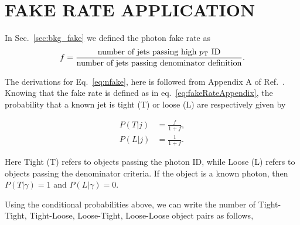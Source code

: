 \chapter{FAKE RATE APPLICATION}
\RaggedRight \parindent=25pt
\label{ch:appendix_fake_rate_app}
In Sec.~\ref{sec:bkg_fake} we defined the photon fake rate as 
\begin{equation} \label{eq:fakeRateAppendix}
f=\frac{\mbox{number of jets passing high \pt ID}}{\mbox{number of jets passing denominator definition}}.
\end{equation}





 
The derivations for Eq.~\ref{eq:nfake}, here is followed from Appendix A of Ref.~\cite{Kaplan:2017}. Knowing that the fake rate is defined as in  eq.~\ref{eq:fakeRateAppendix}, the probability that a known jet is tight (T) or loose (L) are respectively given by

\begin{equation} \label{eq:probTL}
\begin{align*}
    P(T|j) &= \frac{f}{1+f}, \\
    P(L|j) &= \frac{1}{1+f}.
\end{align*}
\end{equation}

Here Tight (T) refers to objects passing the photon ID, while Loose (L) refers to objects passing the denominator criteria. If the object is a known photon, then $P(T|\gamma) = 1$ and $P(L|\gamma) = 0$.

Using the conditional probabilities above, we can write the number of Tight-Tight, Tight-Loose, Loose-Tight, Loose-Loose object pairs as follows,

